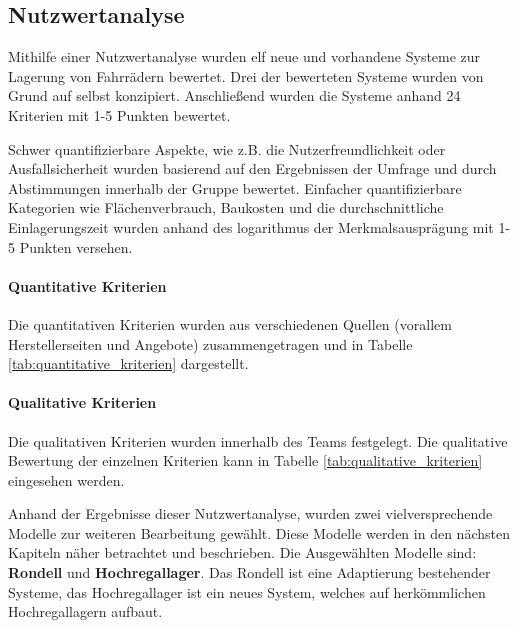 \subsection{Nutzwertanalyse}

Mithilfe einer Nutzwertanalyse wurden elf neue und vorhandene Systeme zur
Lagerung von Fahrrädern bewertet. Drei der bewerteten Systeme wurden von Grund
auf selbst konzipiert. Anschließend wurden die Systeme anhand 24 Kriterien mit 1-5
Punkten bewertet.

Schwer quantifizierbare Aspekte, wie z.B. die Nutzerfreundlichkeit oder
Ausfallsicherheit wurden basierend auf den Ergebnissen der Umfrage und durch
Abstimmungen innerhalb der Gruppe bewertet. Einfacher quantifizierbare Kategorien
wie Flächenverbrauch, Baukosten und die durchschnittliche Einlagerungszeit wurden
anhand des logarithmus der Merkmalsausprägung mit 1-5 Punkten versehen.


\paragraph{Quantitative Kriterien} Die quantitativen Kriterien wurden aus verschiedenen Quellen (vorallem Herstellerseiten und Angebote) zusammengetragen und in Tabelle \ref{tab:quantitative_kriterien} dargestellt.
\paragraph{Qualitative Kriterien} Die qualitativen Kriterien wurden innerhalb des Teams festgelegt. Die qualitative Bewertung der einzelnen Kriterien kann in Tabelle \ref{tab:qualitative_kriterien} eingesehen werden.






Anhand der Ergebnisse dieser Nutzwertanalyse, wurden zwei vielversprechende
Modelle zur weiteren Bearbeitung gewählt. Diese Modelle werden in den nächsten Kapiteln näher betrachtet und beschrieben. Die Ausgewählten Modelle sind: \textbf{Rondell} und \textbf{Hochregallager}. Das Rondell ist eine Adaptierung bestehender Systeme, das Hochregallager ist ein neues System, welches auf herkömmlichen Hochregallagern aufbaut.